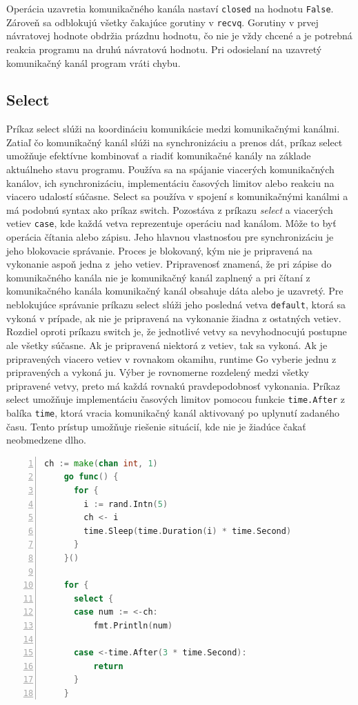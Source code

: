 \documentclass[
  biblatex,
  seconds=true,
  language=slovak,
  figures=false,
  urldate=iso,
  glossaries,
  index
]{kidiplom}
\begin{document}
Operácia uzavretia komunikačného kanála nastaví \texttt{closed} na hodnotu \texttt{False}. Zároveň sa odblokujú všetky čakajúce gorutiny
v \texttt{recvq}. Gorutiny v prvej návratovej hodnote obdržia prázdnu hodnotu, čo nie je vždy chcené a je potrebná reakcia
programu na druhú návratovú hodnotu. Pri odosielaní na uzavretý komunikačný kanál program vráti chybu.

\subsection{Select}
Príkaz select slúži na koordináciu komunikácie medzi komunikačnými kanálmi. Zatiaľ čo komunikačný kanál slúži na synchronizáciu a prenos dát,
príkaz select umožňuje efektívne kombinovať a riadiť komunikačné kanály na základe aktuálneho stavu programu.
Používa sa na spájanie viacerých komunikačných kanálov, ich synchronizáciu, implementáciu časových limitov alebo reakciu na
viacero udalostí súčasne. Select sa používa v spojení s komunikačnými kanálmi a má podobnú syntax ako príkaz switch. \cite{cox2017}
Pozostáva z príkazu \emph{select} a viacerých vetiev \texttt{case}, kde každá vetva
reprezentuje operáciu nad kanálom. Môže to byť operácia čítania alebo zápisu. Jeho hlavnou vlastnosťou pre synchronizáciu
je jeho blokovacie správanie. Proces je blokovaný, kým nie je pripravená na vykonanie aspoň jedna z~jeho vetiev.
Pripravenosť znamená, že pri zápise do komunikačného kanála nie je komunikačný kanál zaplnený a pri čítaní z komunikačného kanála komunikačný kanál obsahuje dáta alebo je uzavretý. Pre neblokujúce správanie
príkazu select slúži jeho posledná vetva \texttt{default}, ktorá sa vykoná v prípade, ak nie je pripravená na vykonanie
žiadna z ostatných vetiev. \cite{select}
Rozdiel oproti príkazu switch je, že jednotlivé vetvy sa nevyhodnocujú postupne ale všetky súčasne.
Ak je pripravená niektorá z vetiev, tak sa vykoná. Ak je pripravených viacero vetiev v rovnakom okamihu, runtime Go vyberie
jednu z pripravených a vykoná ju. Výber je rovnomerne rozdelený medzi všetky pripravené vetvy, preto má každá rovnakú
pravdepodobnosť vykonania\cite{cox2017}. Príkaz select umožňuje implementáciu časových limitov pomocou funkcie \texttt{time.After}
z balíka \texttt{time}, ktorá vracia komunikačný kanál aktivovaný po uplynutí zadaného času. \cite{time} Tento prístup umožňuje riešenie situácií,
kde nie je žiadúce čakať neobmedzene dlho.
\begin{lstlisting}[language=Go, numbers=left, caption={Príklad použitia príkazu select},captionpos=b, label={lst:select}]
	ch := make(chan int, 1)
	go func() {
	  for {
	  	i := rand.Intn(5)
		ch <- i
		time.Sleep(time.Duration(i) * time.Second)
	  }
	}()

	for {
	  select {
	  case num := <-ch:
		  fmt.Println(num)

	  case <-time.After(3 * time.Second):
		  return
	  }
	}
\end{lstlisting}
\end{document}
